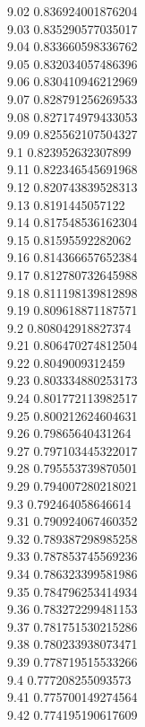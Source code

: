 {9.02	0.836924001876204\\
9.03	0.835290577035017\\
9.04	0.833660598336762\\
9.05	0.832034057486396\\
9.06	0.830410946212969\\
9.07	0.828791256269533\\
9.08	0.827174979433053\\
9.09	0.825562107504327\\
9.1	0.823952632307899\\
9.11	0.822346545691968\\
9.12	0.820743839528313\\
9.13	0.8191445057122\\
9.14	0.817548536162304\\
9.15	0.81595592282062\\
9.16	0.814366657652384\\
9.17	0.812780732645988\\
9.18	0.811198139812898\\
9.19	0.809618871187571\\
9.2	0.808042918827374\\
9.21	0.806470274812504\\
9.22	0.8049009312459\\
9.23	0.803334880253173\\
9.24	0.801772113982517\\
9.25	0.800212624604631\\
9.26	0.79865640431264\\
9.27	0.797103445322017\\
9.28	0.795553739870501\\
9.29	0.794007280218021\\
9.3	0.792464058646614\\
9.31	0.790924067460352\\
9.32	0.789387298985258\\
9.33	0.787853745569236\\
9.34	0.786323399581986\\
9.35	0.784796253414934\\
9.36	0.783272299481153\\
9.37	0.781751530215286\\
9.38	0.780233938073471\\
9.39	0.778719515533266\\
9.4	0.777208255093573\\
9.41	0.775700149274564\\
9.42	0.774195190617609\\
}

